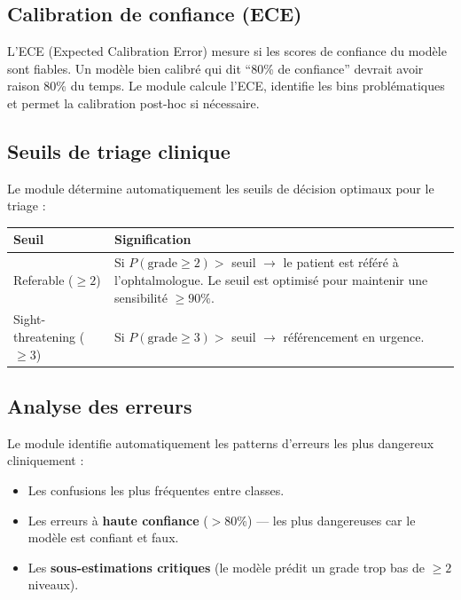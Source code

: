 \documentclass[11pt,a4paper]{article}
\begin{document}
\subsection{Calibration de confiance (ECE)}

L'ECE (Expected Calibration Error) mesure si les scores de confiance du modèle sont fiables. Un modèle bien calibré qui dit ``80\% de confiance'' devrait avoir raison 80\% du temps. Le module calcule l'ECE, identifie les bins problématiques et permet la calibration post-hoc si nécessaire.

\subsection{Seuils de triage clinique}

Le module détermine automatiquement les seuils de décision optimaux pour le triage :

\begin{center}
\renewcommand{\arraystretch}{1.3}
\begin{tabularx}{\textwidth}{lX}
\toprule
\textbf{Seuil} & \textbf{Signification} \\
\midrule
Referable ($\geq 2$) & Si $P(\text{grade} \geq 2) >$ seuil $\to$ le patient est référé à l'ophtalmologue. Le seuil est optimisé pour maintenir une sensibilité $\geq 90\%$. \\
Sight-threatening ($\geq 3$) & Si $P(\text{grade} \geq 3) >$ seuil $\to$ référencement en urgence. \\
\bottomrule
\end{tabularx}
\end{center}

\subsection{Analyse des erreurs}

Le module identifie automatiquement les patterns d'erreurs les plus dangereux cliniquement :
\begin{itemize}[leftmargin=2em]
  \item Les confusions les plus fréquentes entre classes.
  \item Les erreurs à \textbf{haute confiance} ($>$80\%) --- les plus dangereuses car le modèle est confiant et faux.
  \item Les \textbf{sous-estimations critiques} (le modèle prédit un grade trop bas de $\geq 2$ niveaux).
\end{itemize}
\end{document}
